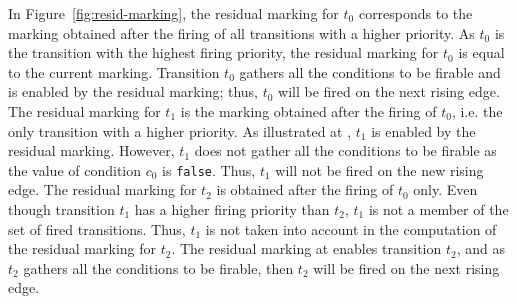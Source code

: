 \documentclass[pdflatex,sn-mathphys]{sn-jnl}%
\theoremstyle{thmstyleone}%
\theoremstyle{thmstyletwo}%
\theoremstyle{thmstylethree}%
\begin{document}
In Figure~\ref{fig:resid-marking}, the residual marking for $t_0$
corresponds to the marking obtained after the firing of all
transitions with a higher priority. As $t_0$ is the transition with
the highest firing priority, the residual marking for $t_0$ is equal
to the current marking. Transition $t_0$ gathers all the conditions to
be firable and is enabled by the residual marking; thus, $t_0$ will be
fired on the next rising edge. The residual marking for $t_1$ is the
marking obtained after the firing of $t_0$, i.e. the only transition
with a higher priority. As illustrated at , $t_1$ is
enabled by the residual marking. However, $t_1$ does not gather all
the conditions to be firable as the value of condition $c_0$ is
\texttt{false}. Thus, $t_1$ will not be fired on the new rising
edge. The residual marking for $t_2$ is obtained after the firing of
$t_0$ only. Even though transition $t_1$ has a higher firing priority
than $t_2$, $t_1$ is not a member of the set of fired transitions.
Thus, $t_1$ is not taken into account in the computation of the
residual marking for $t_2$. The residual marking at 
enables transition $t_2$, and as $t_2$ gathers all the conditions to
be firable, then $t_2$ will be fired on the next rising edge.



\end{document}
